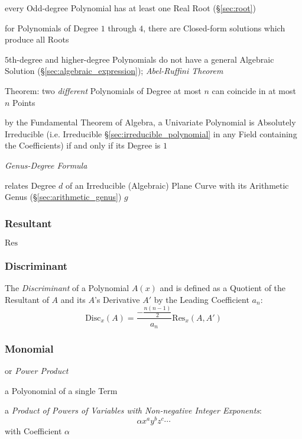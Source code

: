 every Odd-degree Polynomial has at least one Real Root
(\S\ref{sec:root})

for Polynomials of Degree $1$ through $4$, there are Closed-form solutions which
produce all Roots

$5$th-degree and higher-degree Polynomials do not have a general Algebraic
Solution (\S\ref{sec:algebraic_expression}); \emph{Abel-Ruffini Theorem}

Theorem: two \emph{different} Polynomials of Degree at most $n$ can coincide in
at most $n$ Points

by the Fundamental Theorem of Algebra, a Univariate Polynomial is Absolutely
Irreducible (i.e. Irreducible \S\ref{sec:irreducible_polynomial} in any Field
containing the Coefficients) if and only if its Degree is $1$

\emph{Genus-Degree Formula}

relates Degree $d$ of an Irreducible (Algebraic) Plane Curve with its Arithmetic
Genus (\S\ref{sec:arithmetic_genus}) $g$



\subsubsection{Resultant}\label{sec:resultant}

$\mathrm{Res}$



\subsubsection{Discriminant}\label{sec:discriminant}

The \emph{Discriminant} of a Polynomial $A(x)$ and is defined as a Quotient of
the Resultant of $A$ and its $A$'s Derivative $A'$ by the Leading Coefficient
$a_n$:
\[
  \mathrm{Disc}_x(A) = \frac{-\frac{n(n-1)}{2}}{a_n} \mathrm{Res}_x(A, A')
\]



\subsubsection{Monomial}\label{sec:monomial}

or \emph{Power Product}

a Polyonomial of a single Term

a \emph{Product of Powers of Variables with Non-negative Integer Exponents}:
\[
  \alpha x^a y^b z^c \cdots
\]
with Coefficient $\alpha$

